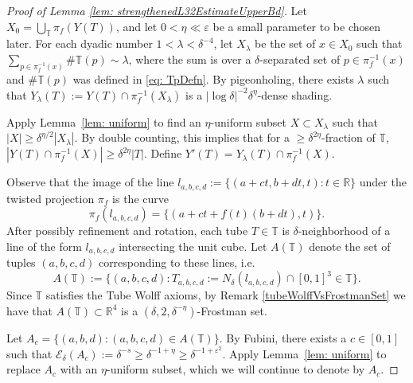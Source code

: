 \documentclass[letterpaper, reqno,11pt]{article}
\numberwithin{equation}{section}
\newcommand{\RR}{\mathbb{R}}
\newcommand{\cP}{A}
\newcommand{\TT}{\mathbb{T}}
\newcommand{\cE}{\mathcal{E}}
\newcommand{\eps}{\varepsilon}
\newcommand{\tubes}{\mathbb{T}}
\numberwithin{thm}{section}
\theoremstyle{remark}
\begin{document}
\begin{proof}[Proof of Lemma \ref{lem: strengthenedL32EstimateUpperBd}]
Let $X_0=\bigcup_\tubes \pi_f(Y(T))$, and let $0<\eta\ll \eps$ be a small parameter to be chosen later. For each dyadic number $1<\lambda < \delta^{-4}$, let $X_{\lambda}$ be the set of $x\in X_0$ such that $
\sum_{p\in \pi_f^{-1}(x)} \#\mathbb{T}(p)\sim \lambda$,  where the sum is over a $\delta$-separated set of $p\in \pi_f^{-1}(x)$ and   $\#\mathbb{T}(p)$ was defined in \eqref{eq: TpDefn}.  By pigeonholing, there exists $\lambda$ such that $ Y_{\lambda}(T):= Y(T)\cap \pi_f^{-1}(X_{\lambda})$ is a $|\log\delta|^{-2} \delta^{\eta}$-dense shading. 

Apply Lemma~\ref{lem: uniform} to find an $\eta$-uniform  subset $X\subset X_\lambda$ such that $|X| \geq \delta^{\eta/2} |X_\lambda|$. By double counting, this implies that for a $\geq \delta^{2\eta}$-fraction of $\mathbb{T}$, $|Y(T)\cap \pi_f^{-1}(X)|\geq \delta^{2\eta} |T|$.  Define $Y'(T)= Y_{\lambda}(T)\cap \pi_f^{-1}(X)$.





Observe that the image of the line $l_{a,b,c,d} := \{(a+ct, b+dt,t ): t\in\mathbb{R}\}$ under the twisted projection $\pi_f$ is the curve 
\[
\pi_f (l_{a,b,c,d})=\{ (a+ct+f(t)(b+dt),t)\}.
\]  
After possibly refinement and rotation, each tube $T\in \TT$ is $\delta$-neighborhood of a line of the form $l_{a,b,c,d}$ intersecting the unit cube. Let $\cP(\TT)$ denote the set of tuples $(a,b,c,d)$ corresponding to these lines, i.e. 
\[ 
\cP(\TT):=\{ (a,b,c,d): T_{a,b,c,d}:=N_{\delta}(l_{a,b,c,d})\cap [0,1]^3\in \TT\}.
\] 
%
Since $\TT$ satisfies the Tube Wolff axioms, by Remark \ref{tubeWolffVsFrostmanSet} we have that $\cP(\TT)\subset \RR^4$ is a $(\delta, 2,\delta^{-\eta})$-Frostman set. 

Let $\cP_c = \{ (a, b, d): (a,b,c,d)\in \cP(\TT)\}$. By Fubini,  there exists a $c\in [0,1]$ such that $\cE_{\delta}(\cP_c):=\delta^{-s} \geq \delta^{-1+\eta}\geq \delta^{-1+\eps^2}$. 
Apply Lemma~\ref{lem: uniform} to replace $\cP_c$ with an $\eta$-uniform subset, which we will continue to denote by $\cP_c$.




\end{proof}
\end{document}
